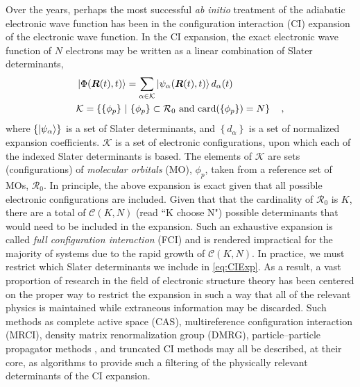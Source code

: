 Over the years, perhaps the most successful \emph{ab initio} treatment of the
adiabatic electronic wave function has been in the configuration interaction
(CI) expansion of the electronic wave function. In the CI expansion, the exact
electronic wave function of $N$ electrons may be written as a linear combination
of Slater determinants,
\begin{align}
&\left\vert \Phi (\boldsymbol{R}(t),t) \right\rangle = \sum_{\alpha \in \mathcal{K}}  
  \left\vert \psi_\alpha (\boldsymbol{R}(t),t) \right\rangle d_\alpha(t)
\label{eq:CIExp} \\
& \mathcal{K} = \left\lbrace \{ \phi_p \} \text{ }\vert\text{ } \{ \phi_p \} \subset
\mathcal{R}_0 \text{ and } \mathrm{card}(\{ \phi_p \}) = N \right\rbrace
\quad ,
\end{align}
where $\left\lbrace\left\vert \psi_\alpha \right\rangle\right\rbrace$ is a set of Slater
determinants, and $\left\lbrace d_\alpha \right\rbrace$ is a set of normalized
expansion coefficients. $\mathcal{K}$ is a set of electronic configurations,
upon which each of the indexed Slater determinants is based. The elements of
$\mathcal{K}$ are sets (configurations) of \emph{molecular orbitals} (MO),
$\phi_p$, taken from a reference set of MOs, $\mathcal{R}_0$.  In principle, the
above expansion is exact given that all possible electronic configurations are
included.  Given that that the cardinality of $\mathcal{R}_0$ is $K$, there are
a total of $\mathcal{C}(K,N)$ (read ``K choose N") possible determinants that
would need to be included in the expansion. Such an exhaustive expansion is
called \emph{full configuration interaction} (FCI) and is rendered impractical
for the majority of systems due to the rapid growth of $\mathcal{C}(K,N)$.
In practice, we  must restrict which Slater determinants we include in
\cref{eq:CIExp}. As a result, a vast proportion of research in the field of
electronic structure theory has been centered on the proper way to restrict the
expansion in such a way that all of the relevant physics is maintained while
extraneous information may be discarded. Such methods as complete active space
(CAS), multireference configuration interaction (MRCI), density matrix
renormalization group (DMRG), particle--particle propagator methods , and
truncated CI methods may all be described, at their core, as algorithms to
provide such a filtering of the physically relevant determinants of the CI
expansion. 

